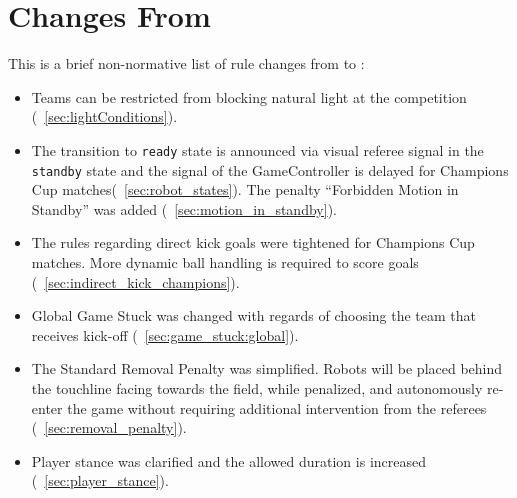 \section{Changes From \LastRCYear}

This is a brief non-normative list of rule changes from \LastRCYear to \RCYear:
\begin{itemize}
  \item Teams can be restricted from blocking natural light at the competition (\cf~\cref{sec:lightConditions}).
  \item The transition to \texttt{ready} state is announced via visual referee signal in the \texttt{standby} state and the signal of the GameController is delayed for Champions Cup matches(\cf~\cref{sec:robot_states}). The penalty ``Forbidden Motion in Standby'' was added (\cf~\cref{sec:motion_in_standby}).
  \item The rules regarding direct kick goals were tightened for Champions Cup matches. More dynamic ball handling is required to score goals (\cf~\cref{sec:indirect_kick_champions}).
  \item Global Game Stuck was changed with regards of choosing the team that receives kick-off (\cf~\cref{sec:game_stuck:global}).
  \item The Standard Removal Penalty was simplified. Robots will be placed behind the touchline facing towards the field, while penalized, and autonomously re-enter the game without requiring additional intervention from the referees (\cf~\cref{sec:removal_penalty}).
  \item Player stance was clarified and the allowed duration is increased (\cf~\cref{sec:player_stance}).
\end{itemize}
